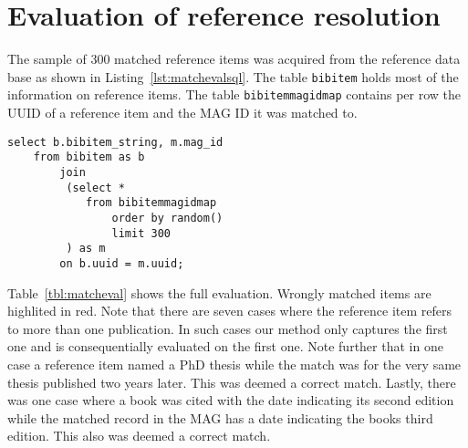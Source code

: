 \chapter{Evaluation of reference resolution}\label{chap:matcheval}

The sample of 300 matched reference items was acquired from the reference data base as shown in Listing~\ref{lst:matchevalsql}. The table \texttt{bibitem} holds most of the information on reference items. The table \texttt{bibitemmagidmap} contains per row the UUID of a reference item and the MAG ID it was matched to.

\begin{lstlisting}[caption={SQL query used to acquire the sample},label={lst:matchevalsql}]
select b.bibitem_string, m.mag_id
    from bibitem as b
        join
         (select *
            from bibitemmagidmap
                order by random()
                limit 300
         ) as m
        on b.uuid = m.uuid;
\end{lstlisting}

Table~\ref{tbl:matcheval} shows the full evaluation. Wrongly matched items are {\color{UniRed}highlited in red}. Note that there are seven cases where the reference item refers to more than one publication. In such cases our method only captures the first one and is consequentially evaluated on the first one. Note further that in one case a reference item named a PhD thesis while the match was for the very same thesis published two years later. This was deemed a correct match. Lastly, there was one case where a book was cited with the date indicating its second edition while the matched record in the MAG has a date indicating the books third edition. This also was deemed a correct match.
\newpage

